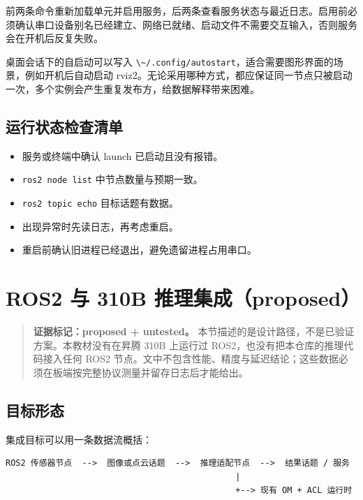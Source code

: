 前两条命令重新加载单元并启用服务，后两条查看服务状态与最近日志。启用前必须确认串口设备别名已经建立、网络已就绪、启动文件不需要交互输入，否则服务会在开机后反复失败。

桌面会话下的自启动可以写入
\passthrough{\lstinline!\~/.config/autostart!}，适合需要图形界面的场景，例如开机后自动启动
rviz2。无论采用哪种方式，都应保证同一节点只被启动一次，多个实例会产生重复发布方，给数据解释带来困难。

\subsection{运行状态检查清单}\label{ux8fd0ux884cux72b6ux6001ux68c0ux67e5ux6e05ux5355}

\begin{itemize}
\tightlist
\item
  服务或终端中确认 launch 已启动且没有报错。
\item
  \passthrough{\lstinline!ros2 node list!} 中节点数量与预期一致。
\item
  \passthrough{\lstinline!ros2 topic echo!} 目标话题有数据。
\item
  出现异常时先读日志，再考虑重启。
\item
  重启前确认旧进程已经退出，避免遗留进程占用串口。
\end{itemize}

\section{ROS2 与 310B
推理集成（proposed）}\label{ros2-ux4e0e-310b-ux63a8ux7406ux96c6ux6210proposed}

\begin{quote}
\textbf{证据标记：proposed + untested。}
本节描述的是设计路径，不是已验证方案。本教材没有在昇腾 310B 上运行过
ROS2，也没有把本仓库的推理代码接入任何 ROS2
节点。文中不包含性能、精度与延迟结论；这些数据必须在板端按完整协议测量并留存日志后才能给出。
\end{quote}

\subsection{目标形态}\label{ux76eeux6807ux5f62ux6001}

集成目标可以用一条数据流概括：

\begin{lstlisting}
ROS2 传感器节点  -->  图像或点云话题  -->  推理适配节点  -->  结果话题 / 服务
                                              |
                                              +--> 现有 OM + ACL 运行时
\end{lstlisting}

